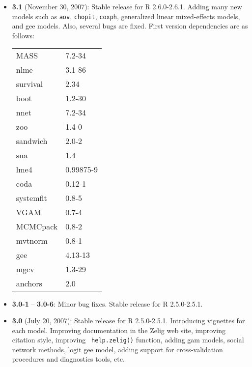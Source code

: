 \begin{itemize}
\item {\bf 3.1} (November 30, 2007): Stable release for R 2.6.0-2.6.1.
  Adding many new models such as {\tt aov}, {\tt chopit}, {\tt coxph},
  generalized linear mixed-effects models, and gee models.  Also,
  several bugs are fixed.  First version dependencies are as
  follows:\newline
\begin{tabular}{ll}\label{table.compat}
MASS      & 7.2-34 \\
nlme      & 3.1-86 \\
survival  & 2.34 \\
boot      & 1.2-30 \\
nnet      & 7.2-34 \\
zoo       & 1.4-0 \\
sandwich  & 2.0-2 \\
sna       & 1.4 \\
lme4      & 0.99875-9 \\
coda      & 0.12-1 \\
systemfit & 0.8-5 \\
VGAM      & 0.7-4 \\
MCMCpack  & 0.8-2 \\
mvtnorm   & 0.8-1 \\
gee       & 4.13-13 \\
mgcv      & 1.3-29 \\
anchors   & 2.0 
\end{tabular}

\item {\bf 3.0-1} -- {\bf 3.0-6}: Minor bug fixes. Stable release for
  R 2.5.0-2.5.1.

\item {\bf 3.0} (July 20, 2007): Stable release for R 2.5.0-2.5.1.
  Introducing vignettes for each model. Improving documentation in the
  Zelig web site, improving citation style, improving {\tt
    help.zelig()} function, adding gam models, social network methods,
  logit gee model, adding support for cross-validation procedures and
  diagnostics tools, etc.


\end{itemize}
